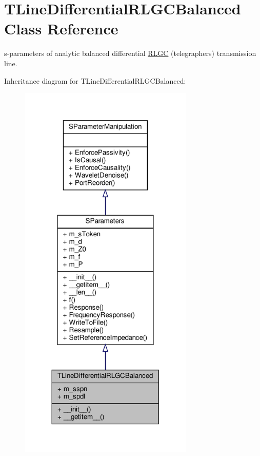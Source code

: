 \hypertarget{classSignalIntegrity_1_1SParameters_1_1Devices_1_1TLineDifferentialRLGCBalanced_1_1TLineDifferentialRLGCBalanced}{}\section{T\+Line\+Differential\+R\+L\+G\+C\+Balanced Class Reference}
\label{classSignalIntegrity_1_1SParameters_1_1Devices_1_1TLineDifferentialRLGCBalanced_1_1TLineDifferentialRLGCBalanced}


s-\/parameters of analytic balanced differential \hyperlink{namespaceSignalIntegrity_1_1SParameters_1_1RLGC}{R\+L\+GC} (telegrapher\textquotesingle{}s) transmission line.  




Inheritance diagram for T\+Line\+Differential\+R\+L\+G\+C\+Balanced\+:
\nopagebreak
\begin{figure}[H]
\begin{center}
\leavevmode
\includegraphics[width=236pt]{classSignalIntegrity_1_1SParameters_1_1Devices_1_1TLineDifferentialRLGCBalanced_1_1TLineDifferen0e32869498bf168ac50b2d0fc632c651}
\end{center}
\end{figure}


